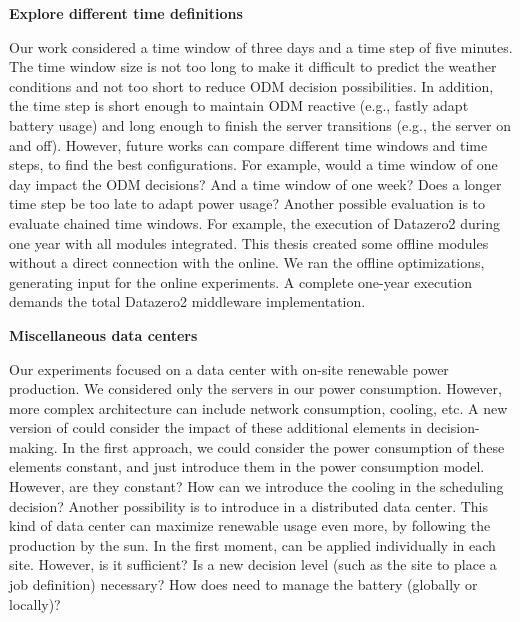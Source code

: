 \textbf{Explore different time definitions}

Our work considered a time window of three days and a time step of five minutes. The time window size is not too long to make it difficult to predict the weather conditions and not too short to reduce ODM decision possibilities. In addition, the time step is short enough to maintain ODM reactive (e.g., fastly adapt battery usage) and long enough to finish the server transitions (e.g., the server on and off). However, future works can compare different time windows and time steps, to find the best configurations. For example, would a time window of one day impact the ODM decisions? And a time window of one week? Does a longer time step be too late to adapt power usage? Another possible evaluation is to evaluate chained time windows. For example, the execution of Datazero2 during one year with all modules integrated. This thesis created some offline modules without a direct connection with the online. We ran the offline optimizations, generating input for the online experiments. A complete one-year execution demands the total Datazero2 middleware implementation. 

\textbf{Miscellaneous data centers}

Our experiments focused on a data center with on-site renewable power production. We considered only the servers in our power consumption. However, more complex architecture can include network consumption, cooling, etc. A new version of \emph{\systemName} could consider the impact of these additional elements in decision-making. In the first approach, we could consider the power consumption of these elements constant, and just introduce them in the power consumption model. However, are they constant? How can we introduce the cooling in the scheduling decision? Another possibility is to introduce \emph{\systemName} in a distributed data center. This kind of data center can maximize renewable usage even more, by following the production by the sun. In the first moment, \emph{\systemName} can be applied individually in each site. However, is it sufficient? Is a new decision level (such as the site to place a job definition) necessary? How does \emph{\systemName} need to manage the battery (globally or locally)?

